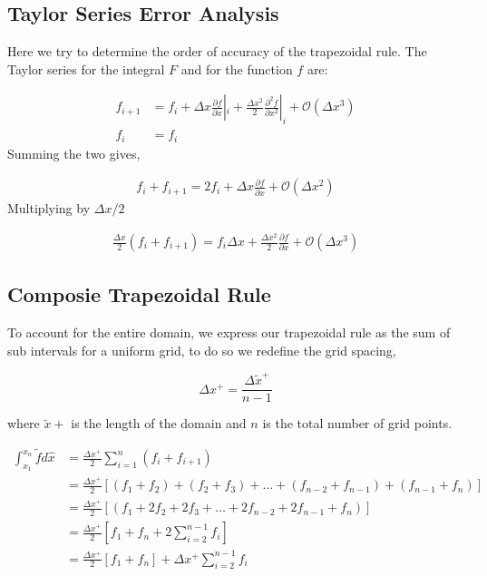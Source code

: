 \documentclass[12pt]{article}
\begin{document}
\subsection{Taylor Series Error Analysis}

Here we try to determine the order of accuracy of the trapezoidal rule. 
The Taylor series for the integral $F$ and for the function $f$ are:

\begin{align*}
    f_{i+1} &= f_i +
    \Delta x \frac{\partial f}{\partial x}|_i +
    \frac{\Delta x^2}{2} \frac{\partial^2 f}{\partial x^2}|_i +
    \mathcal{O}\left( \Delta x^3 \right) \\
    f_i &= f_i
\end{align*}
Summing the two gives,

\begin{align*}
f_i + f_{i+1} = 2 f_i  + \Delta x \frac{\partial f}{\partial x } +
\mathcal{O}\left( \Delta x^2 \right) 
\end{align*}
Multiplying by $\Delta x /2  $

\begin{align*}
    \frac{\Delta x}{2 }(f_i + f_{i+1} )= 
    f_i {\Delta x} + \frac{\Delta x ^2}{2}\frac{\partial f}{\partial x } +
\mathcal{O}\left( \Delta x^3 \right) 
\end{align*}


\subsection{Composie Trapezoidal Rule}
To account for the entire domain, we express our trapezoidal rule as the sum 
of sub intervals for a uniform grid, to do so we redefine the grid spacing,

\[\Delta x^+   = \frac{\Delta \widetilde{ x}^+  }{n - 1}   \]

where $\widetilde{x}+$ is the length of the domain
and $n$ is the total number of grid points. 

\begin{align*}
    \int_{x_1}^{x_n} \widetilde{f} d \hat{x} &= 
    \frac{\Delta x^+}{2} \sum_{i=1}^{n}
    \left( 
        f_i + f_{i+1}
    \right) \\ 
    &=
    \frac{\Delta x^+}{2}  
    \left[ 
        \left( f_1 + f_2 \right) +
        \left( f_2 + f_3 \right)  +\dots +
        \left( f_{n-2} + f_{n-1} \right) + 
        \left( f_{n-1} + f_{n} \right)  
    \right] \\
    &=
    \frac{\Delta x^+}{2}  
    \left[ 
        \left( f_1 +
            2f_2  +
         2f_3+\dots +
         2f_{n-2} + 
         2f_{n-1}  + 
         f_{n} \right)  
    \right] \\
    &=
    \frac{\Delta x^+}{2}
    \left[ 
        f_1 + f_n + 
        2 \sum_{i=2}^{n-1}
        f_i
    \right] \\
    &=
    \frac{\Delta x^+}{2}
    \left[ 
        f_1 + f_n \right] 
        + 
        \Delta x^+ \sum_{i=2}^{n-1}
    f_i
\end{align*}
\end{document}
